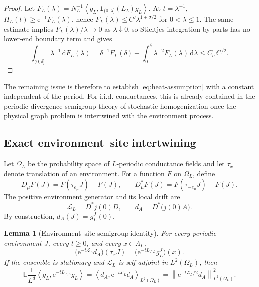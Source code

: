 \documentclass[11pt]{article}
\newtheorem{lemma}[theorem]{Lemma}
\theoremstyle{definition}
\theoremstyle{remark}
\newcommand{\e}{\mathrm e}
\newcommand{\E}{\mathbb E}
\newcommand{\ip}[2]{\left\langle #1,#2\right\rangle}
\newcommand{\norm}[1]{\left\lVert #1\right\rVert}
\newcommand{\dd}{\,\mathrm d}
\begin{document}
\begin{proof}
Let $F_L(\lambda)=N_L^{-1}\ip{g_L}{\bm{1}_{(0,\lambda]}(L_L)g_L}$.  At $t=\lambda^{-1}$,
$H_L(t)\ge\e^{-1}F_L(\lambda)$, hence
$F_L(\lambda)\le C'\lambda^{1+\sigma/2}$ for $0<\lambda\le1$.  The same estimate implies $F_L(\lambda)/\lambda\to0$ as $\lambda\downarrow0$, so Stieltjes integration by parts has no lower-end boundary term and gives
\[
 \int_{(0,\delta]}\lambda^{-1}\dd F_L(\lambda)
 =\delta^{-1}F_L(\delta)
 +\int_0^\delta\lambda^{-2}F_L(\lambda)\dd\lambda
 \le C_\sigma\delta^{\sigma/2}.
\]
\end{proof}

The remaining issue is therefore to establish \eqref{eq:heat-assumption} with a constant independent of the period.  For i.i.d. conductances, this is already contained in the periodic divergence-semigroup theory of stochastic homogenization once the physical graph problem is intertwined with the environment process.

\subsection{Exact environment--site intertwining}

Let $\Omega_L$ be the probability space of $L$-periodic conductance fields and let $\tau_x$ denote translation of an environment.  For a function $F$ on $\Omega_L$, define
\begin{equation}
 D_\mu F(J)=F(\tau_{e_\mu}J)-F(J),
 \qquad
 D_\mu^*F(J)=F(\tau_{-e_\mu}J)-F(J).
\end{equation}
The positive environment generator and its local drift are
\begin{equation}
 \mathscr L_L=D^*j(0)D,
 \qquad
 d_A=D^*\bigl(j(0)A\bigr).
 \label{eq:environment-generator-drift}
\end{equation}
By construction, $d_A(J)=g_L^J(0)$.

\begin{lemma}[Environment--site semigroup identity]
\label{lem:environment-site-intertwining}
For every periodic environment $J$, every $t\ge0$, and every $x\in\Lambda_L$,
\begin{equation}
 \bigl(\e^{-t\mathscr L_L}d_A\bigr)(\tau_xJ)
 =\bigl(\e^{-tL_{J,L}}g_L^J\bigr)(x).
 \label{eq:pointwise-intertwining}
\end{equation}
If the ensemble is stationary and $\mathscr L_L$ is self-adjoint in $L^2(\Omega_L)$, then
\begin{equation}
 \boxed{
 \E\frac1{L^d}\ip{g_L}{\e^{-tL_{J,L}}g_L}
 =\ip{d_A}{\e^{-t\mathscr L_L}d_A}_{L^2(\Omega_L)}
 =\norm{\e^{-t\mathscr L_L/2}d_A}_{L^2(\Omega_L)}^2.}
 \label{eq:annealed-intertwining}
\end{equation}
\end{lemma}
\end{document}
